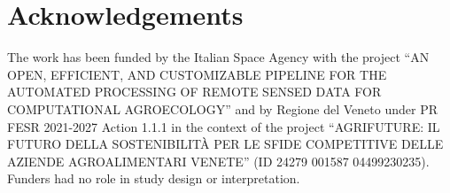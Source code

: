 \documentclass[conference]{IEEEtran}
\begin{document}
\section*{Acknowledgements}
The work has been funded by the Italian Space Agency with the project
``AN OPEN, EFFICIENT, AND CUSTOMIZABLE PIPELINE FOR THE AUTOMATED
PROCESSING OF REMOTE SENSED DATA FOR COMPUTATIONAL AGROECOLOGY''
and by Regione del Veneto under PR FESR 2021-2027 Action 1.1.1 in the
context of the project ``AGRIFUTURE: IL FUTURO DELLA SOSTENIBILIT\`A
PER LE SFIDE COMPETITIVE DELLE AZIENDE AGROALIMENTARI VENETE''
(ID 24279 001587 04499230235).
Funders had no role in study design or interpretation.


\end{document}
